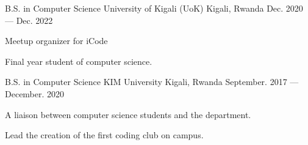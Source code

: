 \begin{cventries}
  \cventry
    {B.S. in Computer Science}
    {University of Kigali (UoK)}
    {Kigali, Rwanda}
    {Dec. 2020 --- Dec. 2022}
    {
      \begin{cvitems}
        \item {Meetup organizer for iCode}
        \item {Final year student of computer science.}
      \end{cvitems}
    }
  \cventry
    {B.S. in Computer Science}
    {KIM University}
    {Kigali, Rwanda}
    {September. 2017 --- December. 2020}
    {
      \begin{cvitems}
        \item {A liaison between computer science students and the department. }
        \item {Lead the creation of the first coding club on campus.}
      \end{cvitems}
    }
\end{cventries}
